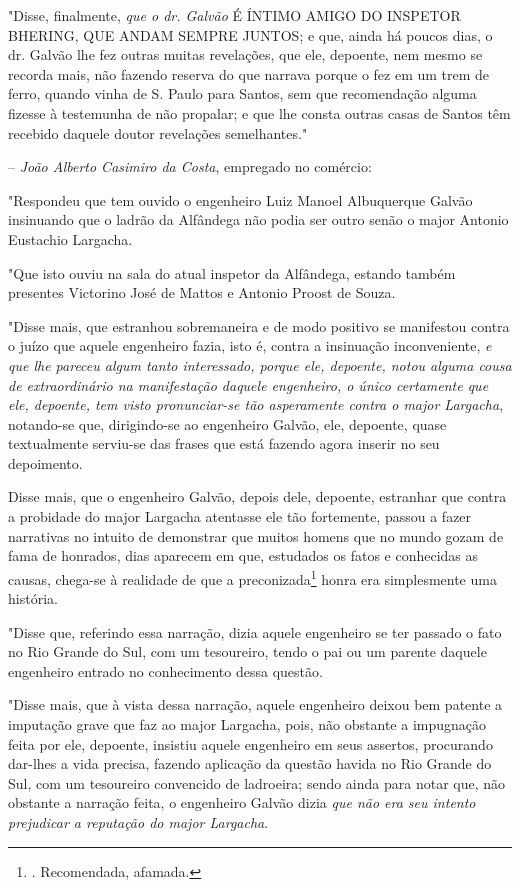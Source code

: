 "Disse, finalmente, \emph{que o dr. Galvão} É ÍNTIMO AMIGO DO INSPETOR
BHERING, QUE ANDAM SEMPRE JUNTOS; e que, ainda há poucos dias, o dr.
Galvão lhe fez outras muitas revelações, que ele, depoente, nem mesmo se
recorda mais, não fazendo reserva do que narrava porque o fez em um trem
de ferro, quando vinha de S. Paulo para Santos, sem que recomendação
alguma fizesse à testemunha de não propalar; e que lhe consta outras
casas de Santos têm recebido daquele doutor revelações semelhantes."

-- \emph{João Alberto Casimiro da Costa}, empregado no comércio:

"Respondeu que tem ouvido o engenheiro Luiz Manoel Albuquerque Galvão
insinuando que o ladrão da Alfândega não podia ser outro senão o major
Antonio Eustachio Largacha.

"Que isto ouviu na sala do atual inspetor da Alfândega, estando também
presentes Victorino José de Mattos e Antonio Proost de Souza.

"Disse mais, que estranhou sobremaneira e de modo positivo se manifestou
contra o juízo que aquele engenheiro fazia, isto é, contra a insinuação
inconveniente, \emph{e que lhe pareceu algum tanto interessado, porque
ele, depoente, notou alguma cousa de extraordinário na manifestação
daquele engenheiro, o único certamente que ele, depoente, tem visto
pronunciar-se tão asperamente contra o major Largacha}, notando-se que,
dirigindo-se ao engenheiro Galvão, ele, depoente, quase textualmente
serviu-se das frases que está fazendo agora inserir no seu depoimento.

Disse mais, que o engenheiro Galvão, depois dele, depoente, estranhar
que contra a probidade do major Largacha atentasse ele tão fortemente,
passou a fazer narrativas no intuito de demonstrar que muitos homens que
no mundo gozam de fama de honrados, dias aparecem em que, estudados os
fatos e conhecidas as causas, chega-se à realidade de que a
preconizada\footnote{. Recomendada, afamada.} honra era simplesmente uma
história.

"Disse que, referindo essa narração, dizia aquele engenheiro se ter
passado o fato no Rio Grande do Sul, com um tesoureiro, tendo o pai ou
um parente daquele engenheiro entrado no conhecimento dessa questão.

"Disse mais, que à vista dessa narração, aquele engenheiro deixou bem
patente a imputação grave que faz ao major Largacha, pois, não obstante
a impugnação feita por ele, depoente, insistiu aquele engenheiro em seus
assertos, procurando dar-lhes a vida precisa, fazendo aplicação da
questão havida no Rio Grande do Sul, com um tesoureiro convencido de
ladroeira; sendo ainda para notar que, não obstante a narração feita, o
engenheiro Galvão dizia \emph{que não era seu intento prejudicar a
reputação do major Largacha}.

